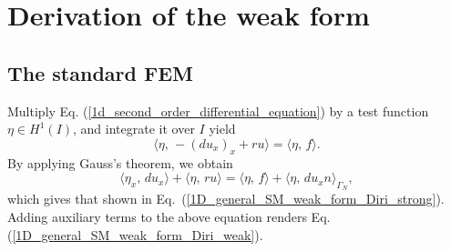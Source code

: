 \documentclass[review,3p]{elsarticle}
\begin{document}
\appendix

\section{Derivation of the weak form}		\label{weak form appendix}

\subsection{The standard FEM}		\label{derivation_weak_form_SM}

Multiply Eq. (\ref{1d_second_order_differential_equation}) by a test function $\eta \in H ^1 (I)$, and integrate it over $I$ yield
\begin{equation}
\langle \eta, \, -\left( d u_x \right)_x + ru \rangle = \langle \eta, \, f \rangle. \label{1D_general_inte}
\end{equation}
By applying Gauss's theorem, we obtain
\begin{equation}
 \langle {\eta} _x, \, d u_x \rangle + \langle \eta, \, ru \rangle = \langle \eta, \, f \rangle + \langle \eta, \, d u_x n \rangle_{ {\Gamma_N}},		\label{1D_general_gauss}
\end{equation}
which gives that shown in Eq.~({\ref{1D_general_SM_weak_form_Diri_strong}}). Adding auxiliary terms to the above equation renders Eq. (\ref{1D_general_SM_weak_form_Diri_weak}).
\end{document}
